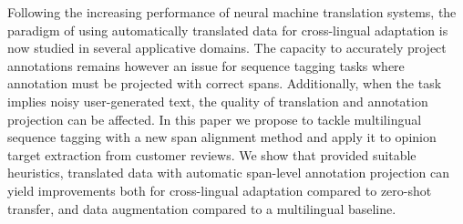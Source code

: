 Following the increasing performance of neural machine translation systems, the paradigm of using automatically translated data for cross-lingual adaptation is now studied in several applicative domains. The capacity to accurately project annotations remains however an issue for sequence tagging tasks where annotation must be projected with correct spans. Additionally, when the task implies noisy user-generated text, the quality of translation and annotation projection can be affected. In this paper we propose to tackle multilingual sequence tagging with a new span alignment method and apply it to opinion target extraction from customer reviews. We show that provided suitable heuristics, translated data with automatic span-level annotation projection can yield improvements both for cross-lingual adaptation compared to zero-shot transfer, and data augmentation compared to a multilingual baseline.
